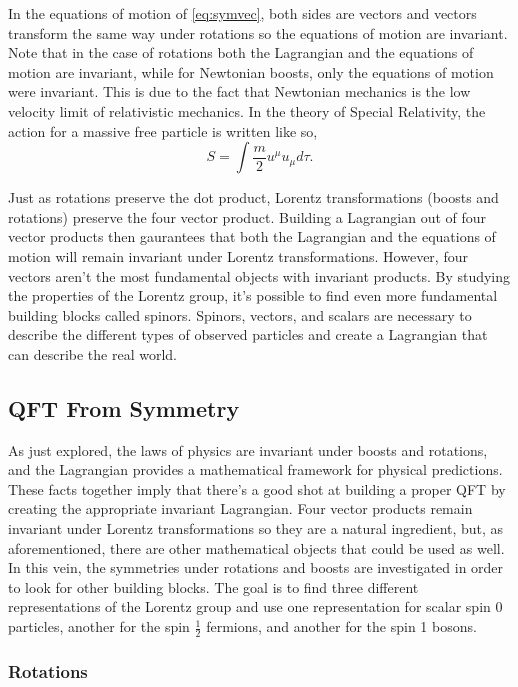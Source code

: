 In the equations of motion of \ref{eq:symvec}, both sides are vectors and vectors transform the same way under rotations so the equations of motion are invariant. Note that in the case of rotations both the Lagrangian and the equations of motion are invariant, while for Newtonian boosts, only the equations of motion were invariant. This is due to the fact that Newtonian mechanics is the low velocity limit of relativistic mechanics. In the theory of Special Relativity, the action for a massive free particle is written like so,
\begin{equation}
S = \int \frac{m}{2}u^{\mu}u_{\mu}d\tau.
\end{equation}

Just as rotations preserve the dot product, Lorentz transformations (boosts and rotations) preserve the four vector product. Building a Lagrangian out of four vector products then gaurantees that both the Lagrangian and the equations of motion will remain invariant under Lorentz transformations. However, four vectors aren't the most fundamental objects with invariant products. By studying the properties of the Lorentz group, it's possible to find even more fundamental building blocks called spinors. Spinors, vectors, and scalars are necessary to describe the different types of observed particles and create a Lagrangian that can describe the real world. 

\subsection{QFT From Symmetry}

As just explored, the laws of physics are invariant under boosts and rotations, and the Lagrangian provides a mathematical framework for physical predictions. These facts together imply that there's a good shot at building a proper QFT by creating the appropriate invariant Lagrangian. Four vector products remain invariant under Lorentz transformations so they are a natural ingredient, but, as aforementioned, there are other mathematical objects that could be used as well. In this vein, the symmetries under rotations and boosts are investigated in order to look for other building blocks. The goal is to find three different representations of the Lorentz group and use one representation for scalar spin 0 particles, another for the spin $\frac{1}{2}$ fermions, and another for the spin 1 bosons.

\subsubsection{Rotations}

